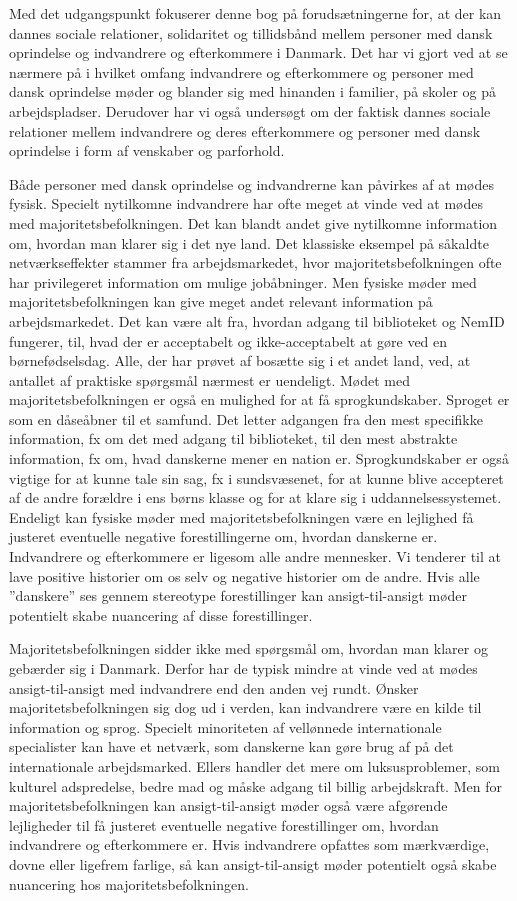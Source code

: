 \documentclass[
]{book}
\begin{document}
Med det udgangspunkt fokuserer denne bog på forudsætningerne for, at der kan dannes sociale relationer, solidaritet og tillidsbånd mellem personer med dansk oprindelse og indvandrere og efterkommere i Danmark. Det har vi gjort ved at se nærmere på i hvilket omfang indvandrere og efterkommere og personer med dansk oprindelse møder og blander sig med hinanden i familier, på skoler og på arbejdspladser. Derudover har vi også undersøgt om der faktisk dannes sociale relationer mellem indvandrere og deres efterkommere og personer med dansk oprindelse i form af venskaber og parforhold.

Både personer med dansk oprindelse og indvandrerne kan påvirkes af at mødes fysisk. Specielt nytilkomne indvandrere har ofte meget at vinde ved at mødes med majoritetsbefolkningen. Det kan blandt andet give nytilkomne information om, hvordan man klarer sig i det nye land. Det klassiske eksempel på såkaldte netværkseffekter stammer fra arbejdsmarkedet, hvor majoritetsbefolkningen ofte har privilegeret information om mulige jobåbninger. Men fysiske møder med majoritetsbefolkningen kan give meget andet relevant information på arbejdsmarkedet. Det kan være alt fra, hvordan adgang til biblioteket og NemID fungerer, til, hvad der er acceptabelt og ikke-acceptabelt at gøre ved en børnefødselsdag. Alle, der har prøvet af bosætte sig i et andet land, ved, at antallet af praktiske spørgsmål nærmest er uendeligt. Mødet med majoritetsbefolkningen er også en mulighed for at få sprogkundskaber. Sproget er som en dåseåbner til et samfund. Det letter adgangen fra den mest specifikke information, fx om det med adgang til biblioteket, til den mest abstrakte information, fx om, hvad danskerne mener en nation er. Sprogkundskaber er også vigtige for at kunne tale sin sag, fx i sundsvæsenet, for at kunne blive accepteret af de andre forældre i ens børns klasse og for at klare sig i uddannelsessystemet. Endeligt kan fysiske møder med majoritetsbefolkningen være en lejlighed få justeret eventuelle negative forestillingerne om, hvordan danskerne er. Indvandrere og efterkommere er ligesom alle andre mennesker. Vi tenderer til at lave positive historier om os selv og negative historier om de andre. Hvis alle ''danskere'' ses gennem stereotype forestillinger kan ansigt-til-ansigt møder potentielt skabe nuancering af disse forestillinger.

Majoritetsbefolkningen sidder ikke med spørgsmål om, hvordan man klarer og gebærder sig i Danmark. Derfor har de typisk mindre at vinde ved at mødes ansigt-til-ansigt med indvandrere end den anden vej rundt. Ønsker majoritetsbefolkningen sig dog ud i verden, kan indvandrere være en kilde til information og sprog. Specielt minoriteten af vellønnede internationale specialister kan have et netværk, som danskerne kan gøre brug af på det internationale arbejdsmarked. Ellers handler det mere om luksusproblemer, som kulturel adspredelse, bedre mad og måske adgang til billig arbejdskraft. Men for majoritetsbefolkningen kan ansigt-til-ansigt møder også være afgørende lejligheder til få justeret eventuelle negative forestillinger om, hvordan indvandrere og efterkommere er. Hvis indvandrere opfattes som mærkværdige, dovne eller ligefrem farlige, så kan ansigt-til-ansigt møder potentielt også skabe nuancering hos majoritetsbefolkningen.
\end{document}

